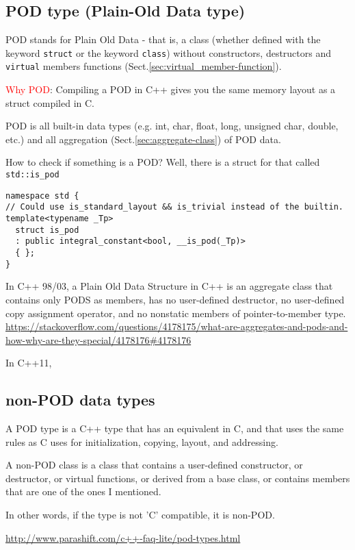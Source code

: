 \subsection{POD type (Plain-Old Data type)}
\label{sec:POD-plain-old-datatype}

POD stands for Plain Old Data - that is, a class (whether defined with the
keyword \verb!struct! or the keyword \verb!class!) without constructors,
destructors and \verb!virtual! members functions
(Sect.\ref{sec:virtual_member-function}).

\textcolor{red}{Why POD}: Compiling a POD in C++ gives you the same memory
layout as a struct compiled in C.


POD is all built-in data types (e.g. int, char, float, long, unsigned char,
double, etc.) and all aggregation (Sect.\ref{sec:aggregate-class}) of POD data. 

How to check if something is a POD? Well, there is a struct for that called
\verb!std::is_pod!
\begin{verbatim}
namespace std {
// Could use is_standard_layout && is_trivial instead of the builtin.
template<typename _Tp>
  struct is_pod
  : public integral_constant<bool, __is_pod(_Tp)>
  { };
}
\end{verbatim}

In C++ 98/03, a Plain Old Data Structure in C++ is an aggregate class that
contains only PODS as members, has no user-defined destructor, no user-defined copy
assignment operator, and no nonstatic members of pointer-to-member type.
\url{https://stackoverflow.com/questions/4178175/what-are-aggregates-and-pods-and-how-why-are-they-special/4178176#4178176}

In C++11, 


\subsection{non-POD data types}
\label{sec:non-POD-class}


A POD type is a C++ type that has an equivalent in C, and that uses the same
rules as C uses for initialization, copying, layout, and addressing.


A non-POD class is a class that contains a user-defined constructor, or
destructor, or virtual functions, or derived from a base class, or contains
members that are one of the ones I mentioned.

In other words, if the type is not 'C' compatible, it is non-POD.

\url{http://www.parashift.com/c++-faq-lite/pod-types.html}



